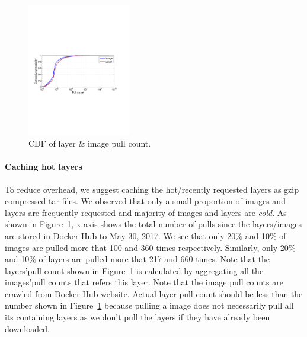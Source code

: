 \begin{figure}
	\centering
	\includegraphics[width=0.4\textwidth]{graphs/pull-cnt.pdf}
	\caption{CDF of layer \& image pull count.
	}
	\label{fig:pull-cnt}
\end{figure}

\paragraph{Caching hot layers}
To reduce overhead, we suggest caching the hot/recently requested layers as
gzip compressed tar files.
%
We observed that only a small proportion of images
and layers are frequently requested and majority of images and layers are
\textit{cold}.
%
As shown in Figure~\ref{fig:pull-cnt}, x-axis shows the total
number of pulls since the layers/images are stored in Docker Hub to May 30,
2017.
%
We see that only 20\% and 10\% of images are pulled more that 100 and
360 times respectively.
%
Similarly, only 20\% and 10\% of layers are pulled
more that 217 and 660 times.
%
Note that the layers'pull count shown in
Figure~\ref{fig:pull-cnt} is calculated by aggregating all the images'pull
counts that refers this layer.
%
Note that the image pull counts are crawled
from Docker Hub website.
%
Actual layer pull count should be less than the
number shown in Figure~\ref{fig:pull-cnt} because pulling a image does not
necessarily pull all its containing layers as we don't pull the layers if they
have already been downloaded.
%

%


%
%

